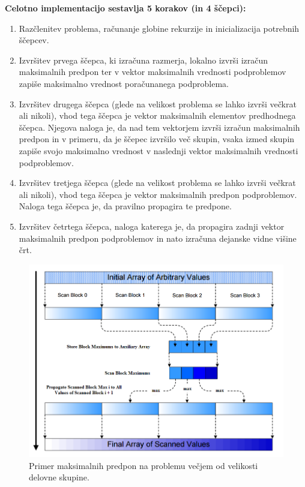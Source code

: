 \documentclass[a4paper,11pt]{article}
\begin{document}
\noindent
\textbf{Celotno implementacijo sestavlja 5 korakov (in 4 ščepci):}
\begin{enumerate}
\item Razčlenitev problema, računanje globine rekurzije in inicializacija potrebnih ščepcev.
\item Izvršitev prvega ščepca, ki izračuna razmerja, lokalno izvrši izračun maksimalnih predpon ter v vektor maksimalnih vrednosti podproblemov zapiše maksimalno vrednost poračunanega podproblema.
\item Izvršitev drugega ščepca (glede na velikost problema se lahko izvrši večkrat ali nikoli), vhod tega ščepca je vektor maksimalnih elementov predhodnega ščepca. Njegova naloga je, da nad tem vektorjem izvrši izračun maksimalnih predpon in v primeru, da je ščepec izvršilo več skupin, vsaka izmed skupin zapiše svojo maksimalno vrednost v naslednji vektor maksimalnih vrednosti podproblemov.
\item Izvršitev tretjega ščepca (glede na velikost problema se lahko izvrši večkrat ali nikoli), vhod tega ščepca je vektor maksimalnih predpon podproblemov. Naloga tega ščepca je, da pravilno propagira te predpone.
\item Izvršitev četrtega ščepca, naloga katerega je, da propagira zadnji vektor maksimalnih predpon podproblemov in nato izračuna dejanske vidne višine črt.

\end{enumerate}


\begin{figure}[htbp]
\begin{center}
\includegraphics[scale=0.5]{max_scan_arbitary.png}
\caption{Primer maksimalnih predpon na problemu večjem od velikosti delovne skupine.}
\label{slika4}
\end{center}
\end{figure}
\end{document}
